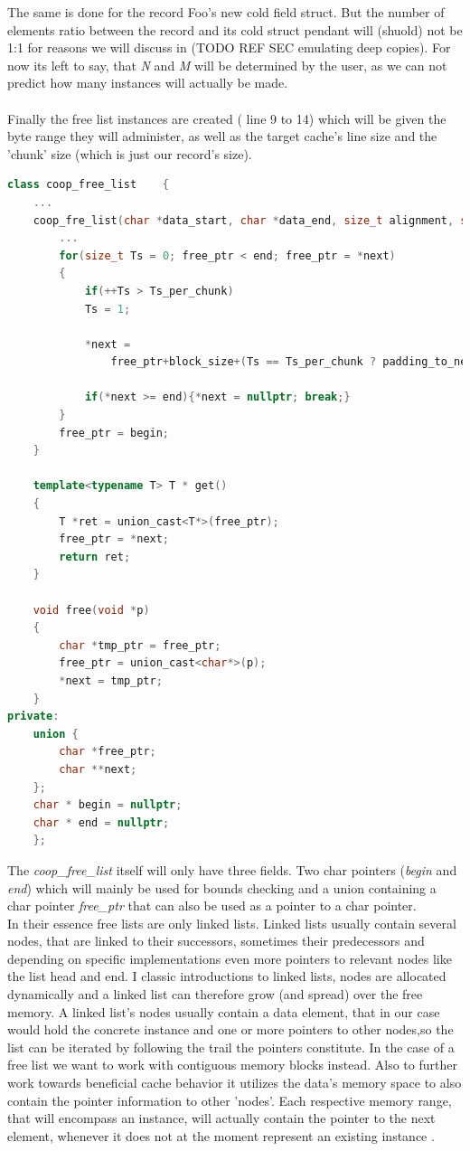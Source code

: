 The same is done for the record Foo's new cold field struct. But the number of elements ratio between the record and its cold struct pendant will (shuold) not be 1:1 for reasons we will discuss in (TODO REF SEC emulating deep copies). For now its left to say, that \textit{N} and \textit{M} will be determined by the user, as we can not predict how many instances will actually be made.\\\\
Finally the free list instances are created ( line 9 to 14) which will be given the byte range they will administer, as well as the target cache's line size and the 'chunk' size (which is just our record's size).
\begin{lstlisting}[language=C++,name={Shortened excerpt of COOP's freelist without asserts and some initialization code.},morekeywords={constexpr, size_t},label={free_list}]
	class coop_free_list	{
	...
	coop_fre_list(char *data_start, char *data_end, size_t alignment, size_t block_size){
		...
		for(size_t Ts = 0; free_ptr < end; free_ptr = *next)
		{
			if(++Ts > Ts_per_chunk)
			Ts = 1;
			
			*next =
				free_ptr+block_size+(Ts == Ts_per_chunk ? padding_to_next : 0);
			
			if(*next >= end){*next = nullptr; break;}
		}
		free_ptr = begin;
	}
	
	template<typename T> T * get()
	{
		T *ret = union_cast<T*>(free_ptr);
		free_ptr = *next;
		return ret;
	}
	
	void free(void *p)
	{
		char *tmp_ptr = free_ptr;
		free_ptr = union_cast<char*>(p);
		*next = tmp_ptr;
	}
private:
	union {
		char *free_ptr;
		char **next;
	};
	char * begin = nullptr;
	char * end = nullptr;
	};
\end{lstlisting}
The \textit{coop\_free\_list} itself will only have three fields. Two char pointers (\textit{begin} and \textit{end}) which will mainly be used for bounds checking and a union containing a char pointer \textit{free\_ptr} that can also be used as a pointer to a char pointer.\\
In their essence free lists are only linked lists. Linked lists usually contain several nodes, that are linked to their successors, sometimes their predecessors and depending on specific implementations even more pointers to relevant nodes like the list head and end. I classic introductions to linked lists, nodes are allocated dynamically and a linked list can therefore grow (and spread) over the free memory. A linked list's nodes usually contain a data element, that in our case would hold the concrete instance and one or more pointers to other nodes,so the list can be iterated by following the trail the pointers constitute. In the case of a free list we want to work with contiguous memory blocks instead. Also to further work towards beneficial cache behavior it utilizes the data's memory space to also contain the pointer information to other 'nodes'. Each respective memory range, that will encompass an instance, will actually contain the pointer to the next element, whenever it does not at the moment represent an existing instance .\\
